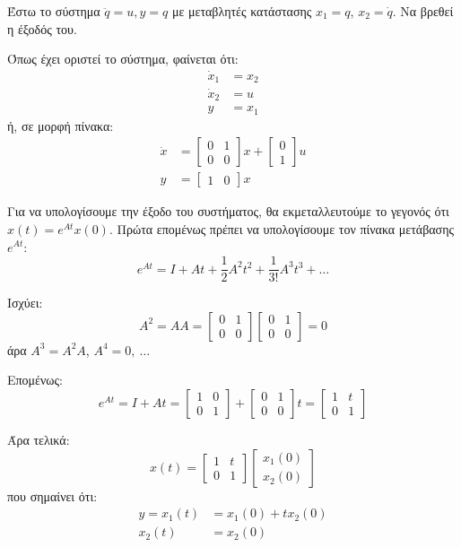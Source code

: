 \documentclass[11pt,a4paper,notitlepage,fleqn]{article}
\begin{document}
\begin{exercise}[Παράδειγμα]
	Έστω το σύστημα \( \ddot q = u, y=q \) με μεταβλητές κατάστασης
	\( x_1=q \), \( x_2 = \dot q \). Να βρεθεί η έξοδός του.
	\tcblower
	
	Όπως έχει οριστεί το σύστημα, φαίνεται ότι:
	\begin{align*}
		\dot x_1 &= x_2\\
		\dot x_2 &= u\\
		y &= x_1
	\end{align*}
	ή, σε μορφή πίνακα:
	\begin{align*}
		\dot x &= \left[\begin{matrix}
		0 & 1 \\ 0 & 0
		\end{matrix}\right]x + \left[\begin{matrix}
		0 \\ 1
		\end{matrix}\right]u\\
		y &= \left[\begin{matrix}
		1 & 0
		\end{matrix}\right] x
	\end{align*}
	
	Για να υπολογίσουμε την έξοδο του συστήματος, θα εκμεταλλευτούμε το γεγονός ότι
	\( x(t) = e^{At} x(0) \). Πρώτα επομένως πρέπει να υπολογίσουμε τον πίνακα μετάβασης
	\( e^{At} \):
	\[
	e^{At} = I + At + \frac{1}{2} A^2t^2 + \frac{1}{3!} A^3t^3 + \dots
	\]
	
	Ισχύει:
	\[
	A^2 = AA = \left[\begin{matrix}
	0 & 1 \\ 0 & 0
	\end{matrix}\right]\left[\begin{matrix}
	0 & 1 \\ 0 & 0
	\end{matrix}\right] = 0
	\]
	άρα \( A^3 = A^2 A \), \( A^4 = 0,\ \dots \)
	
	Επομένως:
	\[
	e^{At} = I + At = \left[\begin{matrix}
	1 & 0 \\ 0 & 1
	\end{matrix}\right] + \left[\begin{matrix}
	0 & 1 \\ 0 & 0
	\end{matrix}\right] t = \left[\begin{matrix}
	1 & t \\ 0 & 1
	\end{matrix}\right]
	\]
	
	Άρα τελικά:
	\[
	x(t) = \left[\begin{matrix}
	1 & t \\ 0 & 1
	\end{matrix}\right]\left[\begin{matrix}
	x_1(0) \\ x_2(0)
	\end{matrix}\right]
	\]
	που σημαίνει ότι:
	\begin{align*}
		y = x_1(t) &= x_1(0) + tx_2(0)\\
		x_2(t) &= x_2(0)
	\end{align*}
	
\end{exercise}
\end{document}
